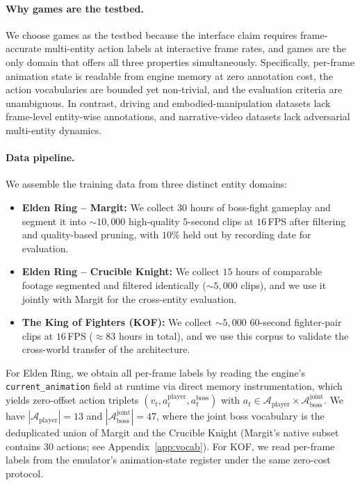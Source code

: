 \paragraph{Why games are the testbed.}
We choose games as the testbed because the interface claim requires frame-accurate multi-entity action labels at interactive frame rates, and games are the only domain that offers all three properties simultaneously. Specifically, per-frame animation state is readable from engine memory at zero annotation cost, the action vocabularies are bounded yet non-trivial, and the evaluation criteria are unambiguous. In contrast, driving and embodied-manipulation datasets lack frame-level entity-wise annotations, and narrative-video datasets lack adversarial multi-entity dynamics.

\paragraph{Data pipeline.}
We assemble the training data from three distinct entity domains:
\begin{itemize}[leftmargin=*,topsep=2pt,itemsep=2pt]
  \item \textbf{Elden Ring -- Margit:} We collect $30$ hours of boss-fight gameplay and segment it into ${\sim}10{,}000$ high-quality $5$-second clips at $16$\,FPS after filtering and quality-based pruning, with $10\%$ held out by recording date for evaluation.
  \item \textbf{Elden Ring -- Crucible Knight:} We collect $15$ hours of comparable footage segmented and filtered identically (${\sim}5{,}000$ clips), and we use it jointly with Margit for the cross-entity evaluation.
  \item \textbf{The King of Fighters (KOF):} We collect ${\sim}5{,}000$ $60$-second fighter-pair clips at $16$\,FPS (${\approx}83$ hours in total), and we use this corpus to validate the cross-world transfer of the architecture.
\end{itemize}
For Elden Ring, we obtain all per-frame labels by reading the engine's \texttt{current\_animation} field at runtime via direct memory instrumentation, which yields zero-offset action triplets $(v_t, a_t^{\text{player}}, a_t^{\text{boss}})$ with $a_t \in \mathcal{A}_{\text{player}} \times \mathcal{A}_{\text{boss}}^{\text{joint}}$. We have $|\mathcal{A}_{\text{player}}|=13$ and $|\mathcal{A}_{\text{boss}}^{\text{joint}}|=47$, where the joint boss vocabulary is the deduplicated union of Margit and the Crucible Knight (Margit's native subset contains $30$ actions; see Appendix~\ref{app:vocab}). For KOF, we read per-frame labels from the emulator's animation-state register under the same zero-cost protocol.

